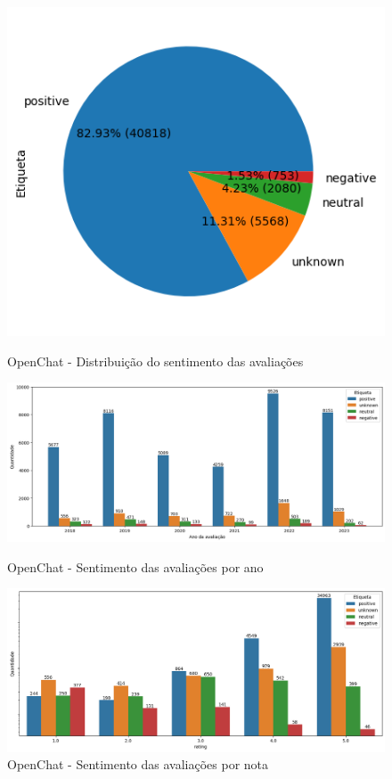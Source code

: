 \begin{figure}
	\centering
	\begin{minipage}{0.8\textwidth}
		\centering
		\includegraphics[width=.6\textwidth]{figs/openchat/distribuicao_pizza.png}
		\caption{OpenChat - Distribuição do sentimento das avaliações}
		\label{img:openchat_pizza_distribuicao}
	\end{minipage}\hfill
	\begin{minipage}{1\textwidth}
		\centering
		\includegraphics[width=1\textwidth]{figs/openchat/sentimento_ano.png}
		\caption{OpenChat - Sentimento das avaliações por ano}
		\label{img:openchat_sentimento_ano}
	\end{minipage}\hfill
	\begin{minipage}{1\textwidth}
		\centering
		\includegraphics[width=1\textwidth]{figs/openchat/sentimento_nota.png}
		\caption{OpenChat - Sentimento das avaliações por nota}
		\label{img:openchat_sentimento_nota}
	\end{minipage}
\end{figure}







